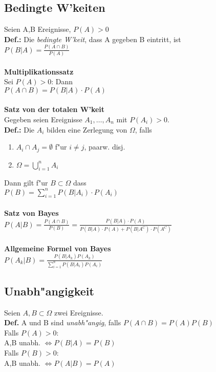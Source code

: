 \documentclass[10pt, a4paper, twocolumn]{scrartcl}
\begin{document}
\subsection{Bedingte W'keiten}

Seien A,B Ereignisse, $P(A)>0$\\
\textbf{Def.:} Die \textit{bedingte W'keit}, dass A gegeben B eintritt, ist\\
$P(B|A)=\frac{P(A\cap B)}{P(A)}$\\\\

\textbf{Multiplikationssatz}\\
Sei $P(A) > 0$: Dann\\
$P(A\cap B)=P(B|A)\cdotp P(A)$\\\\

\textbf{Satz von der totalen W'keit}\\
Gegeben seien Ereignisse $A_1,\ldots,A_n$ mit $P(A_i)>0$.\\
\textbf{Def.:} Die $A_i$ bilden eine Zerlegung von $\Omega$, falls
\begin{enumerate}
 \item $A_i \cap A_j = \emptyset$ f"ur $i \neq j$, paarw. disj.
 \item $\Omega = \bigcup\limits^n_{i=1}A_i$
\end{enumerate}
Dann gilt f"ur $B \subset \Omega$ dass\\
$P(B)=\sum\limits^n_{i=1}P(B|A_i)\cdotp P(A_i)$\\\\

\textbf{Satz von Bayes}\\
$P(A|B)=\frac{P(A\cap B)}{P(B)}=\frac{P(B|A)\cdotp P(A)}{P(B|A)\cdotp P(A)+P(B|A^C)\cdotp P(A^C)}$\\\\

\textbf{Allgemeine Formel von Bayes}\\
$P(A_k|B)=\frac{P(B|A_k) P(A_k)}{\sum\limits^n_{i=1} P(B|A_i)P(A_i)}$

\subsection{Unabh"angigkeit}

Seien $A,B \subset \Omega$ zwei Ereignisse.\\
\textbf{Def.} A und B sind \textit{unabh"angig}, falls $P(A\cap B)=P(A)P(B)$\\
Falls $P(A)>0$:\\
A,B unabh. $\Leftrightarrow P(B|A)=P(B)$\\
Falls $P(B)>0$:\\
A,B unabh. $\Leftrightarrow P(A|B)=P(A)$
\end{document}
